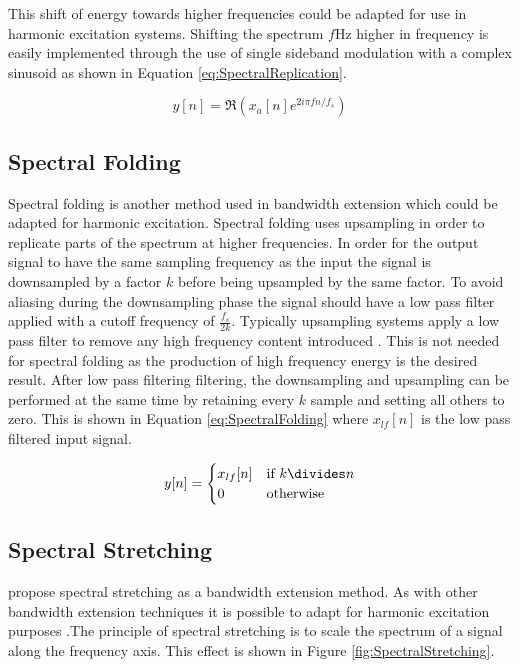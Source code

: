 		This shift of energy towards higher frequencies could be adapted for use in harmonic excitation systems.
		Shifting the spectrum $f$Hz higher in frequency is easily implemented through the use of single sideband
		modulation with a complex sinusoid as shown in Equation \ref{eq:SpectralReplication}.

		\begin{equation}
			y[n] = \Re \left( x_{a}[n] e^{2i\pi fn/ f_{s}} \right)
			\label{eq:SpectralReplication}
		\end{equation}

	\subsection{Spectral Folding}
	\label{sec:Excitation-Methods-SpectralFolding}
		Spectral folding is another method used in bandwidth extension \citep{friedrich2007spectral} which could be
		adapted for harmonic excitation. Spectral folding uses upsampling in order to replicate parts of the
		spectrum at higher frequencies. In order for the output signal to have the same sampling frequency as the
		input the signal is downsampled by a factor $k$ before being upsampled by the same factor. To avoid aliasing
		during the downsampling phase the signal should have a low pass filter applied with a cutoff frequency of
		$\frac{f_{s}}{2k}$. Typically upsampling systems apply a low pass filter to remove any high frequency
		content introduced \citep{oppenheim2014discrete}. This is not needed for spectral folding as the production
		of high frequency energy is the desired result. After low pass filtering filtering, the downsampling and
		upsampling can be performed at the same time by retaining every $k$ sample and setting all others
		to zero. This is shown in Equation \ref{eq:SpectralFolding} where $x_{lf}[n]$ is the low pass filtered input
		signal.

		\begin{equation}
			y[n] = \begin{cases}
				x_{lf}[n] & \text{if $k \divides n$} \\
				0 & \text{otherwise}
			\end{cases}
			\label{eq:SpectralFolding}
		\end{equation}

	\subsection{Spectral Stretching}
	\label{sec:Excitation-Methods-SpectralStretching}
		\citet{nagel2009a} propose spectral stretching as a bandwidth extension method. As with other bandwidth
		extension techniques it is possible to adapt for harmonic excitation purposes .The principle of spectral
		stretching is to scale the spectrum of a signal along the frequency axis. This effect is shown in Figure
		\ref{fig:SpectralStretching}.

